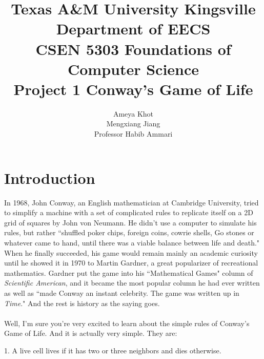 \documentclass[12pt]{report}
\begin{document}
 
 
\title{Texas A\&M University Kingsville\\
Department of EECS\\
CSEN 5303 Foundations of Computer Science\\
Project 1 Conway's Game of Life
}%
\author{Ameya Khot\\
Mengxiang Jiang\\ %
Professor Habib Ammari} %
 
\maketitle

\tableofcontents

\chapter{Introduction}
In 1968, John Conway, an English mathematician at Cambridge University, 
tried to simplify a machine with a set of complicated rules to replicate itself on
a 2D grid of squares by John von Neumann. He didn't use a computer to simulate his rules, but rather ``shuffled poker chips, foreign coins, 
cowrie shells, Go stones or whatever came to hand, until there was a viable balance between life and death."\cite{o'connor:2004}
When he finally succeeded, his game would remain mainly an academic curiosity until he showed it in 1970 to
Martin Gardner, a great popularizer of recreational mathematics. Gardner put the game into his
``Mathematical Games" column of \emph{Scientific American}, and it became the most popular column he had ever written as well as 
``made Conway an instant celebrity. The game was written up in \emph{Time}."\cite{mulcahy:2014} And the rest is history as the saying goes.\\\\
Well, I'm sure you're very excited to learn about the simple rules of Conway's Game of Life. And it is actually very simple. They are:

1. A live cell lives if it has two or three neighbors and dies otherwise.
\end{document}
